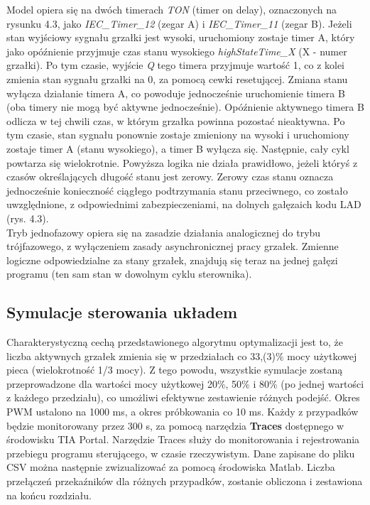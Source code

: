 \documentclass[a4paper,twoside,12pt]{book}
\begin{document}
Model opiera się na dwóch timerach \textit{TON} (timer on delay), oznaczonych na rysunku 4.3, jako \textit{IEC\_Timer\_12} (zegar A) i \textit{IEC\_Timer\_11} (zegar B). Jeżeli stan wyjściowy sygnału grzałki jest wysoki, uruchomiony zostaje timer A, który jako opóźnienie przyjmuje czas stanu wysokiego \textit{highStateTime\_X} (X - numer grzałki). Po tym czasie, wyjście \textit{Q} tego timera przyjmuje wartość 1, co z kolei zmienia stan sygnału grzałki na 0, za pomocą cewki resetującej. Zmiana stanu wyłącza działanie timera A, co powoduje jednocześnie uruchomienie timera B (oba timery nie mogą być aktywne jednocześnie). Opóźnienie aktywnego timera B odlicza w tej chwili czas, w którym grzałka powinna pozostać nieaktywna. Po tym czasie, stan sygnału ponownie zostaje zmieniony na wysoki i uruchomiony zostaje timer A (stanu wysokiego), a timer B wyłącza się. Następnie, cały cykl powtarza się wielokrotnie.
Powyższa logika nie działa prawidłowo, jeżeli któryś z czasów określających długość stanu jest zerowy. Zerowy czas stanu oznacza jednocześnie konieczność ciągłego podtrzymania stanu przeciwnego, co zostało uwzględnione, z odpowiednimi zabezpieczeniami, na dolnych gałęzaich kodu LAD (rys. 4.3).\\

Tryb jednofazowy opiera się na zasadzie działania analogicznej do trybu trójfazowego, z wyłączeniem zasady asynchronicznej pracy grzałek. Zmienne logiczne odpowiedzialne za stany grzałek, znajdują się teraz na jednej gałęzi programu (ten sam stan w dowolnym cyklu sterownika).

\newpage
\subsection{Symulacje sterowania układem}
Charakterystyczną cechą przedstawionego algorytmu optymalizacji jest to, że liczba aktywnych grzałek zmienia się w przedziałach co 33,(3)\% mocy użytkowej pieca (wielokrotność 1/3 mocy). Z tego powodu, wszystkie symulacje zostaną przeprowadzone dla wartości mocy użytkowej 20\%, 50\% i 80\% (po jednej wartości z każdego przedziału), co umożliwi efektywne zestawienie różnych podejść. Okres PWM ustalono na 1000 ms, a okres próbkowania co 10 ms. Każdy z przypadków będzie monitorowany przez 300 s, za pomocą narzędzia \textbf{Traces} dostępnego w środowisku TIA Portal. Narzędzie Traces służy do monitorowania i rejestrowania przebiegu programu sterującego, w czasie rzeczywistym. Dane zapisane do pliku CSV można następnie zwizualizować za pomocą środowiska Matlab. Liczba przełączeń przekaźników dla różnych przypadków, zostanie obliczona i zestawiona na końcu rozdziału.
\end{document}
